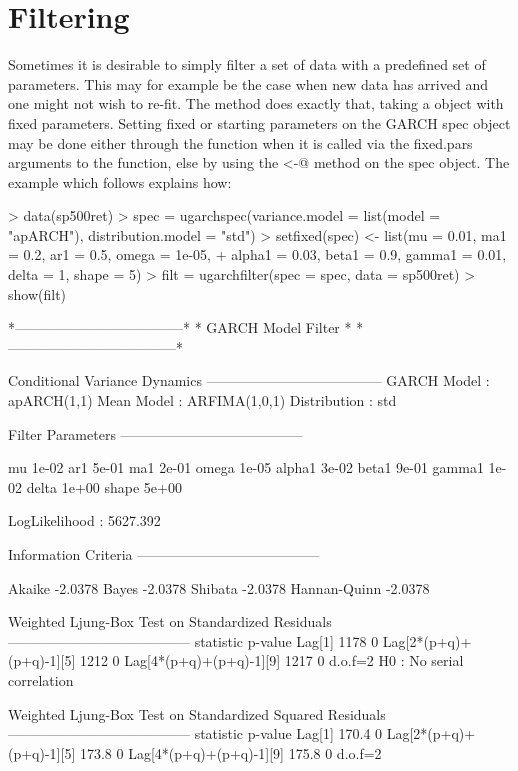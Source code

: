 \section{Filtering}\label{section:filtering}
Sometimes it is desirable to simply filter a set of data with a predefined set
of parameters. This may for example be the case when new data has arrived and
one might not wish to re-fit. The \verb@ugarchfilter@ method does exactly that,
taking a \verb@uGARCHspec@ object with fixed parameters. Setting fixed or
starting parameters on the GARCH spec object may be done either through the
\verb@ugarchspec@ function when it is called via the fixed.pars arguments to the
function, else by using the \verb@setfixed<-@ method on the spec object.
The example which follows explains how:
\begin{Schunk}
\begin{Sinput}
> data(sp500ret)
> spec = ugarchspec(variance.model = list(model = "apARCH"), distribution.model = "std")
> setfixed(spec) <- list(mu = 0.01, ma1 = 0.2, ar1 = 0.5, omega = 1e-05,
+     alpha1 = 0.03, beta1 = 0.9, gamma1 = 0.01, delta = 1, shape = 5)
> filt = ugarchfilter(spec = spec, data = sp500ret)
> show(filt)
\end{Sinput}
\begin{Soutput}
*------------------------------------*
*          GARCH Model Filter        *
*------------------------------------*

Conditional Variance Dynamics 	
--------------------------------------
GARCH Model	: apARCH(1,1)
Mean Model	: ARFIMA(1,0,1)
Distribution	: std

Filter Parameters
---------------------------------------

mu     1e-02
ar1    5e-01
ma1    2e-01
omega  1e-05
alpha1 3e-02
beta1  9e-01
gamma1 1e-02
delta  1e+00
shape  5e+00

LogLikelihood : 5627.392

Information Criteria
---------------------------------------

Akaike       -2.0378
Bayes        -2.0378
Shibata      -2.0378
Hannan-Quinn -2.0378

Weighted Ljung-Box Test on Standardized Residuals
---------------------------------------
                        statistic p-value
Lag[1]                       1178       0
Lag[2*(p+q)+(p+q)-1][5]      1212       0
Lag[4*(p+q)+(p+q)-1][9]      1217       0
d.o.f=2
H0 : No serial correlation

Weighted Ljung-Box Test on Standardized Squared Residuals
---------------------------------------
                        statistic p-value
Lag[1]                      170.4       0
Lag[2*(p+q)+(p+q)-1][5]     173.8       0
Lag[4*(p+q)+(p+q)-1][9]     175.8       0
d.o.f=2


\end{Soutput}
\end{Schunk}
